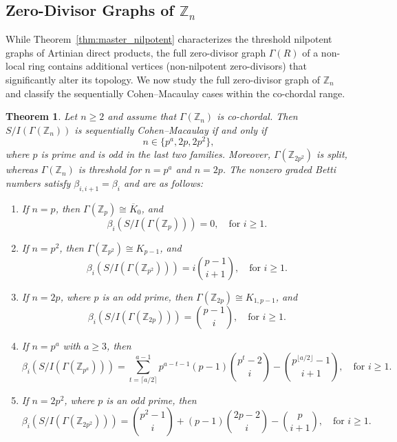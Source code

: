 \documentclass[12pt, reqno]{amsart}
\newtheorem{theorem}{Theorem}[section]
\theoremstyle{definition}
\numberwithin{equation}{section}
\begin{document}
	\subsection{Zero-Divisor Graphs of \texorpdfstring{$\mathbb Z_n$}{Z-n}}
	While Theorem~\ref{thm:master_nilpotent} characterizes the threshold nilpotent graphs of Artinian direct products, the full zero-divisor graph $\Gamma(R)$ of a non-local ring contains additional vertices (non-nilpotent zero-divisors) that significantly alter its topology. We now study the full zero-divisor graph of $\mathbb Z_n$ and classify the sequentially Cohen--Macaulay cases within the co-chordal range.
	
	\begin{theorem}\label{thm:scm_zdg_classification}
		Let $n\ge2$ and assume that $\Gamma(\mathbb Z_n)$ is co-chordal.  Then $S/I(\Gamma(\mathbb Z_n))$ is sequentially Cohen--Macaulay if and only if
		\[
		n\in\{p^a,2p,2p^2\},
		\]
		where $p$ is prime and is odd in the last two families.  Moreover, $\Gamma(\mathbb Z_{2p^2})$ is split, whereas $\Gamma(\mathbb Z_n)$ is threshold for $n=p^a$ and $n=2p$.  The nonzero graded Betti numbers satisfy $\beta_{i,i+1}=\beta_i$ and are as follows:
		\begin{enumerate}
			\item If $n=p$, then $\Gamma(\mathbb Z_{p})\cong \overline K_{0}$, and
			\[
			\beta_{i}(S/I(\Gamma(\mathbb Z_{p}))) =0, \quad \text{for } i \ge1.
			\]
			
			\item If $n=p^2$, then $\Gamma(\mathbb Z_{p^2})\cong K_{p-1}$, and
			\[
			\beta_i(S/I(\Gamma(\mathbb Z_{p^2}))) = i\binom{p-1}{i+1}, \quad \text{for } i \ge1.
			\]
			
			\item If $n=2p$, where $p$ is an odd prime, then $\Gamma(\mathbb Z_{2p})\cong K_{1,p-1}$, and
			\[
			\beta_i(S/I(\Gamma(\mathbb Z_{2p}))) = \binom{p-1}{i}, \quad \text{for } i \ge1.
			\]
			
			\item If $n=p^a$ with $a\ge 3$, then
			\[
			\beta_i(S/I(\Gamma(\mathbb Z_{p^a}))) = \sum_{t=\lceil a/2 \rceil}^{a-1} p^{a-t-1}(p-1) \binom{p^t - 2}{i} - \binom{p^{\lfloor a/2 \rfloor} - 1}{i+1}, \quad \text{for } i \ge1.
			\]
			
			\item If $n=2p^2$, where $p$ is an odd prime, then
			\[
			\beta_i(S/I(\Gamma(\mathbb Z_{2p^2}))) = \binom{p^2-1}{i} + (p-1)\binom{2p-2}{i}
			- \binom{p}{i+1}, \quad \text{for } i \ge1.
			\]
		\end{enumerate}
	\end{theorem}
	
\end{document}
